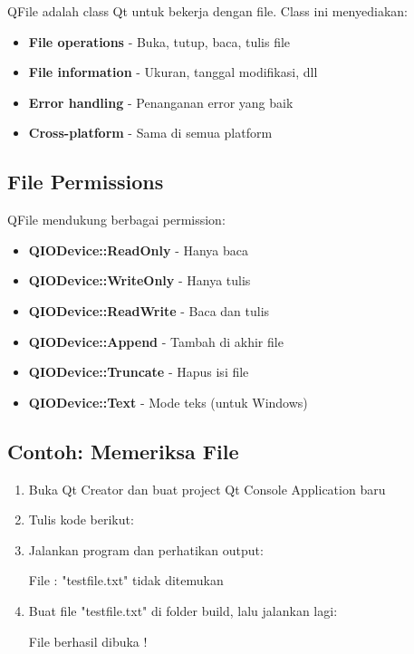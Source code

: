 QFile adalah class Qt untuk bekerja dengan file. Class ini menyediakan:

\begin{itemize}
\item \textbf{File operations} - Buka, tutup, baca, tulis file
\item \textbf{File information} - Ukuran, tanggal modifikasi, dll
\item \textbf{Error handling} - Penanganan error yang baik
\item \textbf{Cross-platform} - Sama di semua platform
\end{itemize}

\subsection{File Permissions}

QFile mendukung berbagai permission:

\begin{itemize}
\item \textbf{QIODevice::ReadOnly} - Hanya baca
\item \textbf{QIODevice::WriteOnly} - Hanya tulis
\item \textbf{QIODevice::ReadWrite} - Baca dan tulis
\item \textbf{QIODevice::Append} - Tambah di akhir file
\item \textbf{QIODevice::Truncate} - Hapus isi file
\item \textbf{QIODevice::Text} - Mode teks (untuk Windows)
\end{itemize}

\subsection{Contoh: Memeriksa File}

\begin{enumerate}
\item Buka Qt Creator dan buat project Qt Console Application baru
\item Tulis kode berikut:



\item Jalankan program dan perhatikan output:

\begin{lcverbatim}
File :  "testfile.txt"  tidak ditemukan
\end{lcverbatim}

\item Buat file "testfile.txt" di folder build, lalu jalankan lagi:

\begin{lcverbatim}
File berhasil dibuka !
\end{lcverbatim}
\end{enumerate}

